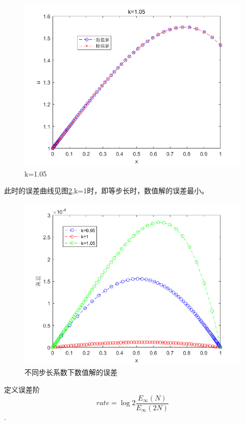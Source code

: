 \documentclass[withoutpreface,bwprint]{cumcmthesis} %
\begin{document}
	\begin{figure}
	\centering
	\includegraphics[width=0.7\linewidth]{figures/f3}
	\caption{k=1.05}
	\label{fig:f3}
	\end{figure}
	
	
	此时的误差曲线见图\ref{fig:f4},k=1时，即等步长时，数值解的误差最小。
	\begin{figure}
	\centering
	\includegraphics[width=0.7\linewidth]{figures/f4}
	\caption{不同步长系数下数值解的误差}
	\label{fig:f4}
	\end{figure}
	
	定义误差阶
	$$rate=\log{2}{\dfrac{E_{\infty}(N)}{E_{\infty}(2N)}}$$.
	
\end{document}
